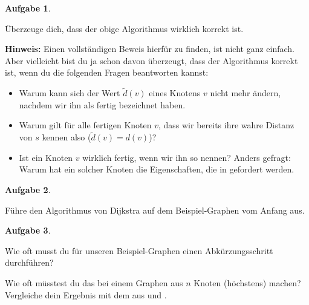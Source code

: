 \documentclass[a4paper,ngerman,12pt]{scrartcl}
\theoremstyle{definition}
\newtheorem{aufg}{Aufgabe}
\newenvironment{aufgabe}[1][]
		{\begin{shaded}\vspace{-0.3cm}\begin{aufg}\emph{#1} \par\medskip}
		{\end{aufg}\vspace{-0.3cm}\end{shaded}}
\theoremstyle{plain}
\theoremstyle{remark}
\begin{document}
\begin{aufgabe}
	Überzeuge dich, dass der obige Algorithmus wirklich korrekt ist.
	
	\textbf{Hinweis:} Einen vollständigen Beweis hierfür zu finden, ist nicht ganz einfach. Aber vielleicht bist du ja schon davon überzeugt, dass der Algorithmus korrekt ist, wenn du die folgenden Fragen beantworten kannst:
	\begin{itemize}
		\item Warum kann sich der Wert $\tilde{d}(v)$ eines Knotens $v$ nicht mehr ändern, nachdem wir ihn als fertig bezeichnet haben.
		\item Warum gilt für alle fertigen Knoten $v$, dass wir bereits ihre wahre Distanz von $s$ kennen also ($\tilde{d}(v)=d(v)$)?
		\item Ist ein Knoten $v$ wirklich fertig, wenn wir ihn so nennen? Anders gefragt: Warum hat ein solcher Knoten die Eigenschaften, die in  gefordert werden.
	\end{itemize}
\end{aufgabe}

\begin{aufgabe}
	Führe den Algorithmus von Dijkstra auf dem Beispiel-Graphen vom Anfang aus.
\end{aufgabe}

\begin{aufgabe}
	Wie oft musst du für unseren Beispiel-Graphen einen Abkürzungsschritt durchführen? 
	
	Wie oft müsstest du das bei einem Graphen aus $n$ Knoten (höchstens) machen? Vergleiche dein Ergebnis mit dem aus  und .
\end{aufgabe}
\end{document}
